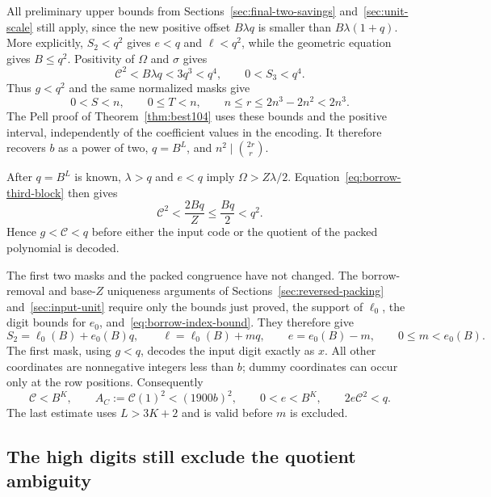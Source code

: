 All preliminary upper bounds from Sections~\ref{sec:final-two-savings}
and~\ref{sec:unit-scale} still apply, since the new positive offset
$B\lambda q$ is smaller than $B\lambda(1+q)$. More explicitly,
$S_2<q^2$ gives $e<q$ and $\ell<q^2$, while the geometric equation
gives $B\le q^2$. Positivity of $\Omega$ and $\sigma$ gives
\[
 \mathcal C^2<B\lambda q<3q^3<q^4,
 \qquad 0<S_3<q^4.
\]
Thus $g<q^2$ and the same normalized masks give
\[
 0<S<n,\qquad0\le T<n,\qquad
 n\le r\le2n^3-2n^2<2n^3.
\]
The Pell proof of Theorem~\ref{thm:best104} uses these bounds and the
positive interval, independently of the coefficient values in the
encoding. It therefore recovers $b$ as a power of two, $q=B^L$, and
$n^2\mid\binom{2r}{r}$.

After $q=B^L$ is known, $\lambda>q$ and $e<q$ imply
$\Omega>Z\lambda/2$. Equation~\eqref{eq:borrow-third-block} then gives
\begin{equation}\label{eq:borrow-code-bound}
 \mathcal C^2<\frac{2Bq}{Z}\le\frac{Bq}{2}<q^2.
\end{equation}
Hence $g<\mathcal C<q$ before either the input code or the quotient
of the packed polynomial is decoded.

The first two masks and the packed congruence have not changed.
The borrow-removal and base-$Z$ uniqueness arguments of
Sections~\ref{sec:reversed-packing} and~\ref{sec:input-unit} require
only the bounds just proved, the support of $\ell_0$, the digit bounds
for $e_0$, and~\eqref{eq:borrow-index-bound}. They therefore give
\begin{equation}\label{eq:borrow-alias}
 S_2=\ell_0(B)+e_0(B)q,\qquad
 \ell=\ell_0(B)+mq,\qquad e=e_0(B)-m,\qquad 0\le m<e_0(B).
\end{equation}
The first mask, using $g<q$, decodes the input digit exactly as $x$.
All other coordinates are nonnegative integers less than $b$; dummy
coordinates can occur only at the row positions. Consequently
\begin{equation}\label{eq:borrow-polynomial-bounds}
 \mathcal C<B^K,\qquad
 A_C:=\mathcal C(1)^2<(1900b)^2,\qquad
 0<e<B^K,\qquad 2e\mathcal C^2<q.
\end{equation}
The last estimate uses $L>3K+2$ and is valid before $m$ is excluded.

\subsection{The high digits still exclude the quotient ambiguity}

